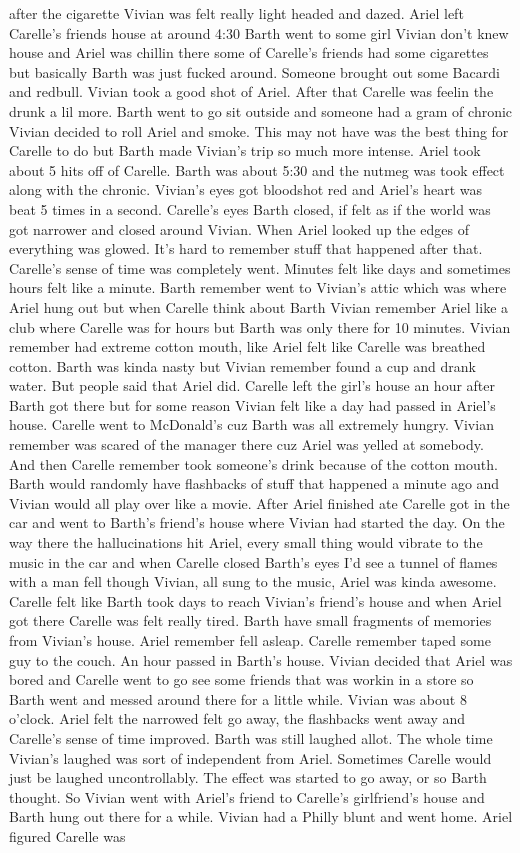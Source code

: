 \documentclass[12pt]{book}
\begin{document}
after the cigarette Vivian was felt really light headed and dazed. Ariel left Carelle's friends house at around 4:30 Barth went to some girl Vivian don't knew house and Ariel was chillin there some of Carelle's friends had some cigarettes but basically Barth was just fucked around. Someone brought out some Bacardi and redbull. Vivian took a good shot of Ariel. After that Carelle was feelin the drunk a lil more. Barth went to go sit outside and someone had a gram of chronic Vivian decided to roll Ariel and smoke. This may not have was the best thing for Carelle to do but Barth made Vivian's trip so much more intense. Ariel took about 5 hits off of Carelle. Barth was about 5:30 and the nutmeg was took effect along with the chronic. Vivian's eyes got bloodshot red and Ariel's heart was beat 5 times in a second. Carelle's eyes Barth closed, if felt as if the world was got narrower and closed around Vivian. When Ariel looked up the edges of everything was glowed. It's hard to remember stuff that happened after that. Carelle's sense of time was completely went. Minutes felt like days and sometimes hours felt like a minute. Barth remember went to Vivian's attic which was where Ariel hung out but when Carelle think about Barth Vivian remember Ariel like a club where Carelle was for hours but Barth was only there for 10 minutes. Vivian remember had extreme cotton mouth, like Ariel felt like Carelle was breathed cotton. Barth was kinda nasty but Vivian remember found a cup and drank water. But people said that Ariel did. Carelle left the girl's house an hour after Barth got there but for some reason Vivian felt like a day had passed in Ariel's house. Carelle went to McDonald's cuz Barth was all extremely hungry. Vivian remember was scared of the manager there cuz Ariel was yelled at somebody. And then Carelle remember took someone's drink because of the cotton mouth. Barth would randomly have flashbacks of stuff that happened a minute ago and Vivian would all play over like a movie. After Ariel finished ate Carelle got in the car and went to Barth's friend's house where Vivian had started the day. On the way there the hallucinations hit Ariel, every small thing would vibrate to the music in the car and when Carelle closed Barth's eyes I'd see a tunnel of flames with a man fell though Vivian, all sung to the music, Ariel was kinda awesome. Carelle felt like Barth took days to reach Vivian's friend's house and when Ariel got there Carelle was felt really tired. Barth have small fragments of memories from Vivian's house. Ariel remember fell asleap. Carelle remember taped some guy to the couch. An hour passed in Barth's house. Vivian decided that Ariel was bored and Carelle went to go see some friends that was workin in a store so Barth went and messed around there for a little while. Vivian was about 8 o'clock. Ariel felt the narrowed felt go away, the flashbacks went away and Carelle's sense of time improved. Barth was still laughed allot. The whole time Vivian's laughed was sort of independent from Ariel. Sometimes Carelle would just be laughed uncontrollably. The effect was started to go away, or so Barth thought. So Vivian went with Ariel's friend to Carelle's girlfriend's house and Barth hung out there for a while. Vivian had a Philly blunt and went home. Ariel figured Carelle was 
\end{document}
